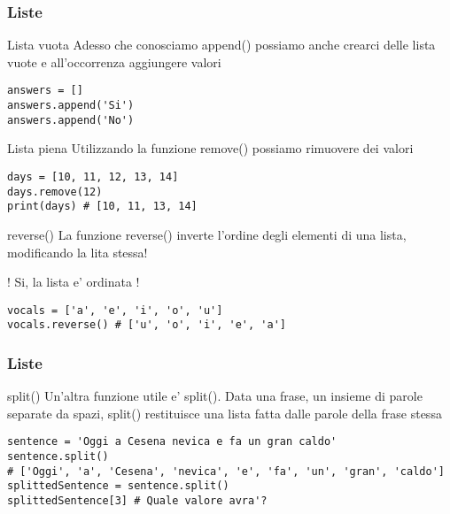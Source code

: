 \begin{frame}[fragile]
\frametitle{Liste}
    \begin{block}{Lista vuota}
Adesso che conosciamo append() possiamo anche crearci delle lista vuote e all'occorrenza aggiungere valori
    \end{block}
    
    \begin{lstlisting}
answers = []
answers.append('Si')
answers.append('No')
    \end{lstlisting}

    \begin{block}{Lista piena}
Utilizzando la funzione remove() possiamo rimuovere dei valori
    \end{block}
    
    \begin{lstlisting}
days = [10, 11, 12, 13, 14]
days.remove(12)
print(days) # [10, 11, 13, 14]
    \end{lstlisting}

    \begin{block}{reverse()}
La funzione reverse() inverte l'ordine degli elementi di una lista, modificando la lita stessa!

! Si, la lista e' ordinata !
    \end{block}

    \begin{lstlisting}
vocals = ['a', 'e', 'i', 'o', 'u']
vocals.reverse() # ['u', 'o', 'i', 'e', 'a']
    \end{lstlisting}

\end{frame}


\begin{frame}[fragile]
\frametitle{Liste}
    \begin{block}{split()}
Un'altra funzione utile e' split().
Data una frase, un insieme di parole separate da spazi, split() restituisce una lista fatta dalle parole della frase stessa
    \end{block}
    
    \begin{lstlisting}
sentence = 'Oggi a Cesena nevica e fa un gran caldo'
sentence.split()
# ['Oggi', 'a', 'Cesena', 'nevica', 'e', 'fa', 'un', 'gran', 'caldo']
splittedSentence = sentence.split()
splittedSentence[3] # Quale valore avra'?
    \end{lstlisting}

\end{frame}

